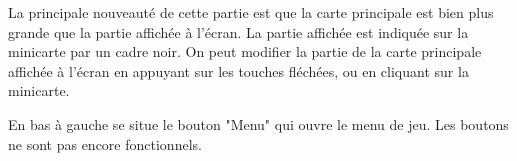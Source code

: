 \documentclass[11pt,a4paper]{article}
\begin{document}
La principale nouveauté de cette partie est que la carte principale est bien plus grande que la partie affichée à l'écran. La partie affichée est indiquée sur la minicarte par un cadre noir. On peut modifier la partie de la carte principale affichée à l'écran en appuyant sur les touches fléchées, ou en cliquant sur la minicarte.
~~

En bas à gauche se situe le bouton "Menu" qui ouvre le menu de jeu. Les boutons ne sont pas encore fonctionnels.
\end{document}
